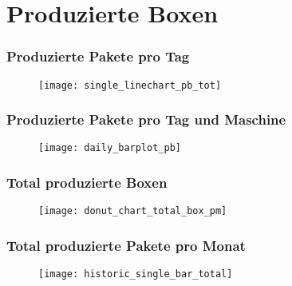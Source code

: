 \section{Produzierte Boxen}
\begin{frame}
    \frametitle{Produzierte Pakete pro Tag}
    \begin{figure}
        \centering
        \texttt{[image: single\_linechart\_pb\_tot]}
    \end{figure}
\end{frame}

\begin{frame}
    \frametitle{Produzierte Pakete pro Tag und Maschine}

    \begin{figure}
        \centering
        \texttt{[image: daily\_barplot\_pb]}
    \end{figure}

\end{frame}

\begin{frame}
    \frametitle{Total produzierte Boxen}

    \begin{figure}
        \centering
        \texttt{[image: donut\_chart\_total\_box\_pm]}
    \end{figure}

\end{frame}

\begin{frame}
    \frametitle{Total produzierte Pakete pro Monat}

    \begin{figure}
        \centering
        \texttt{[image: historic\_single\_bar\_total]}
    \end{figure}

\end{frame}